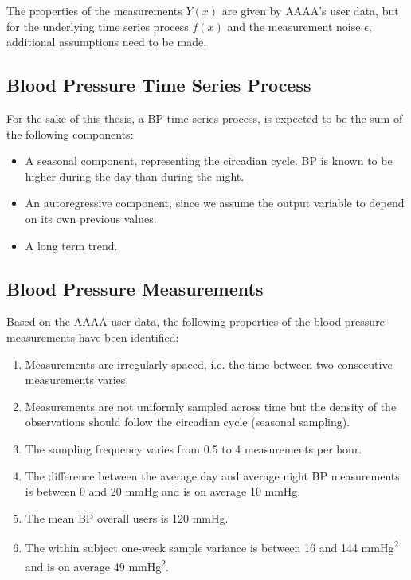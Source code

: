 The properties of the measurements $Y(x)$ are given by AAAA's
user data, but for the underlying time series process $f(x)$ and the measurement noise
$\epsilon$, additional assumptions need to be made.

\subsection{Blood Pressure Time Series Process}\label{subsec:blood-pressure-time-series-process}
For the sake of this thesis, a BP time series process,
is expected to be the sum of the following components:
\begin{itemize}
    \item A seasonal component, representing the circadian cycle.
    BP is known to be higher during the day than during the night.
    \item An autoregressive component, since we assume the output variable to depend on its own previous values.
    \item A long term trend.
\end{itemize}


\subsection{Blood Pressure Measurements}\label{subsec:blood-pressure-measurements}
Based on the AAAA user data, the following properties of
the blood pressure measurements have been identified:
\begin{enumerate}
    \item Measurements are irregularly spaced, i.e. the time between two consecutive measurements varies.
    \item Measurements are not uniformly sampled across time but the density of the observations should
    follow the circadian cycle (seasonal sampling).
    \item The sampling frequency varies from 0.5 to 4 measurements per hour.
    \item The difference between the average day and average night BP measurements is between
    0 and 20 mmHg and is on average 10 mmHg.
    \item The mean BP overall users is 120 mmHg.
    \item The within subject one-week sample variance is between 16 and
    144 mmHg\textsuperscript{2} and is on average 49 mmHg\textsuperscript{2}.
\end{enumerate}


